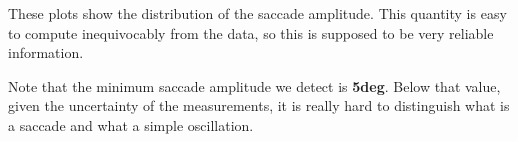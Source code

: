 These plots show the distribution of the saccade amplitude. This quantity is  easy to compute inequivocably from the data, so this is supposed to be very reliable information.

Note that the minimum saccade amplitude we detect is \textbf{5deg}. Below that value, given the uncertainty of the measurements, it is really hard to distinguish what is a saccade and what a simple oscillation. 